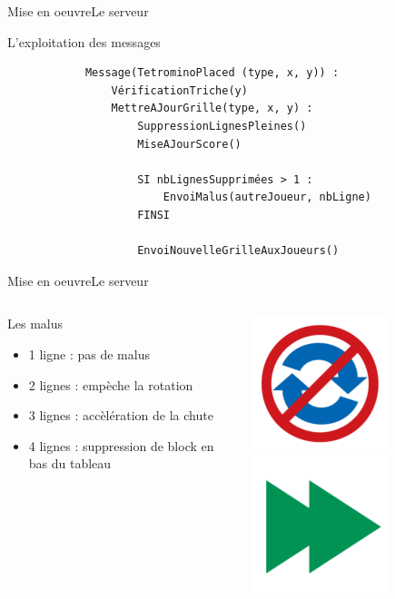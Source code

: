 \documentclass[french]{beamer}
\begin{document}
	\begin{frame}[fragile]{Mise en oeuvre}{Le serveur}
		\begin{block}{L'exploitation des messages}
			\begin{verbatim}
			Message(TetrominoPlaced (type, x, y)) :
				VérificationTriche(y)
				MettreAJourGrille(type, x, y) :
					SuppressionLignesPleines()
					MiseAJourScore()

					SI nbLignesSupprimées > 1 :
						EnvoiMalus(autreJoueur, nbLigne)
					FINSI

					EnvoiNouvelleGrilleAuxJoueurs()
			\end{verbatim}
		\end{block}

	\end{frame}



	\begin{frame}{Mise en oeuvre}{Le serveur}
			\begin{columns}

			\begin{column}{0.5\textwidth}
				\begin{block}{Les malus}
					\begin{itemize}
						\item 1 ligne : pas de malus
						\item 2 lignes : empèche la rotation
						\item 3 lignes : accèlération de la chute
						\item 4 lignes : suppression de block en bas du tableau 
					\end{itemize}
				\end{block}
			\end{column}


			\begin{column}{0.3\textwidth}
				\includegraphics[scale=0.3]{../ressources/malusNoRotate.png}
				\includegraphics[scale=0.3]{../ressources/malusSpeed.png}
			\end{column}

		\end{columns}


	\end{frame}
\end{document}

